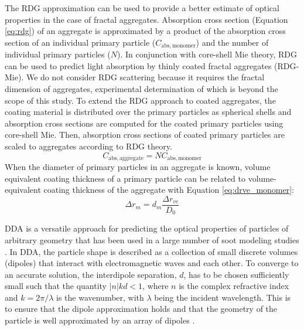 The RDG approximation \citep{RN40,kerker2016scattering} can be used to provide a better estimate of optical properties in the case of fractal aggregates. Absorption cross section (Equation \ref{eq:rdg}) of an aggregate is approximated by a product of the absorption cross section of an individual primary particle ($C_\mathrm{abs,monomer}$) and the number of individual primary particles ($N$). In conjunction with core-shell Mie theory, RDG can be used to predict light absorption by thinly coated fractal aggregates (RDG-Mie). We do not consider RDG scattering because it requires the fractal dimension of aggregates, experimental determination of which is beyond the scope of this study. To extend the RDG approach to coated aggregates, the coating material is distributed over the primary particles as spherical shells and absorption cross sections are computed for the coated primary particles using core-shell Mie. Then, absorption cross sections of coated primary particles are scaled to aggregates according to RDG theory.
\begin{equation}
    C_\mathrm{abs,aggregate}=NC_\mathrm{abs,monomer}
    \label{eq:rdg}
\end{equation}
When the diameter of primary particles in an aggregate is known, volume equivalent coating thickness of a primary particle can be related to volume-equivalent coating thickness of the aggregate with Equation \ref{eq:drve_monomer}:
\begin{equation}
    \Delta r_{m}=d_m\frac{\Delta r_{ve}}{D_0}
    \label{eq:drve_monomer}
\end{equation}

DDA \citep{RN33} is a versatile approach for predicting the optical properties of particles of arbitrary geometry that has been used in a large number of soot modeling studies \citep{RN26,RN27,RN28}. In DDA, the particle shape is described as a collection of small discrete volumes (dipoles) that interact with electromagnetic waves and each other. To converge to an accurate solution, the interdipole separation, $d$, has to be chosen sufficiently small such that the quantity $|n|kd < 1$, where $n$ is the complex refractive index and $k = 2\pi/\lambda$ is the wavenumber, with $\lambda$ being the incident wavelength. This is to ensure that the dipole approximation holds \citep{RN29} and that the geometry of the particle is well approximated by an array of dipoles \citep{RN30}.

